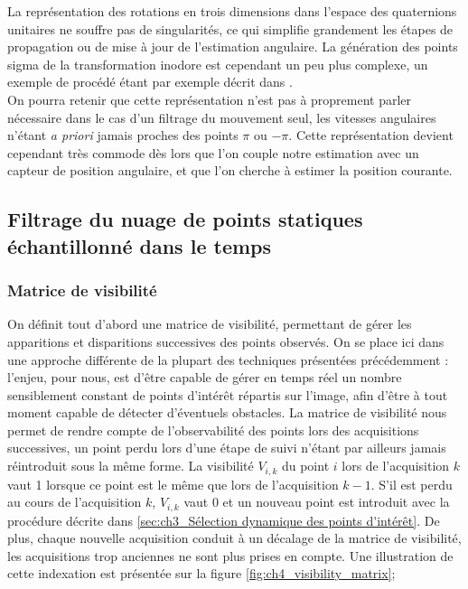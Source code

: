 La représentation des rotations en trois dimensions dans l'espace des quaternions unitaires ne souffre pas de singularités, ce qui simplifie grandement les étapes de propagation ou de mise à jour de l'estimation angulaire. La génération des points sigma de la transformation inodore est cependant un peu plus complexe, un exemple de procédé étant par exemple décrit dans \cite{Kraft2003}. \\
On pourra retenir que cette représentation n'est pas à proprement parler nécessaire dans le cas d'un filtrage du mouvement seul, les vitesses angulaires n'étant \textit{a priori} jamais proches des points $\pi$ ou $-\pi$. Cette représentation devient cependant très commode dès lors que l'on couple notre estimation avec un capteur de position angulaire, et que l'on cherche à estimer la position courante.


\subsection{Filtrage du nuage de points statiques échantillonné dans le temps} \label{sec:ch4_filtrage_nuage}
\subsubsection{Matrice de visibilité} \label{sec:ch4_matrice_visibilité}
On définit tout d'abord une matrice de visibilité, permettant de gérer les apparitions et disparitions successives des points observés. On se place ici dans une approche différente de la plupart des techniques présentées précédemment : l'enjeu, pour nous, est d'être capable de gérer en temps réel un nombre sensiblement constant de points d'intérêt répartis sur l'image, afin d'être à tout moment capable de détecter d'éventuels obstacles. La matrice de visibilité nous permet de rendre compte de l'observabilité des points lors des acquisitions successives, un point perdu lors d'une étape de suivi n'étant par ailleurs jamais réintroduit sous la même forme. La visibilité $V_{i,k}$ du point $i$ lors de l'acquisition $k$ vaut 1 lorsque ce point est le même que lors de l'acquisition $k-1$. S'il est perdu au cours de l'acquisition $k$, $V_{i,k}$ vaut 0 et un nouveau point est introduit avec la procédure décrite dans \ref{sec:ch3_Sélection dynamique des points d'intérêt}. De plus, chaque nouvelle acquisition conduit à un décalage de la matrice de visibilité, les acquisitions trop anciennes ne sont plus prises en compte. Une illustration de cette indexation est présentée sur la figure \ref{fig:ch4_visibility_matrix};

